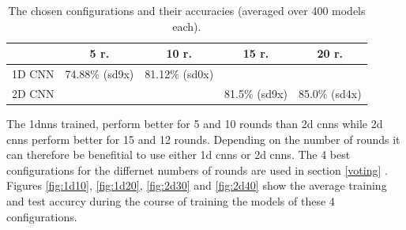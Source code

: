 \begin{table}[H]
	\centering
	
		\begin{tabular}{|l||c|c|c|c|}
			\hline
			& 5 r. & 10 r. & 15 r. & 20 r.  \\
			\hline
			\hline
			1D CNN & 74.88\% (sd9x) & 81.12\% (sd0x) & &  \\
			\hline
			2D CNN &  & & 81.5\% (sd9x) & 85.0\% (sd4x)  \\
			\hline
		\end{tabular}
	\caption[tabelle kurz]{The chosen configurations and their accuracies (averaged over 400 models each). }%
	\label{tab:chosen_configs}
\end{table}

The 1dnns trained, perform better for 5 and 10 rounds than 2d cnns while 2d cnns perform better for 15 and 12 rounds. Depending on the number of rounds it can therefore be benefitial to use either 1d cnns or 2d cnns. The 4 best configurations for the differnet numbers of rounds are used in section \ref{voting} . Figures \ref{fig:1d10}, \ref{fig:1d20}, \ref{fig:2d30} and \ref{fig:2d40} show the average training and test accurcy during the course of training the models of these 4 configurations. 

